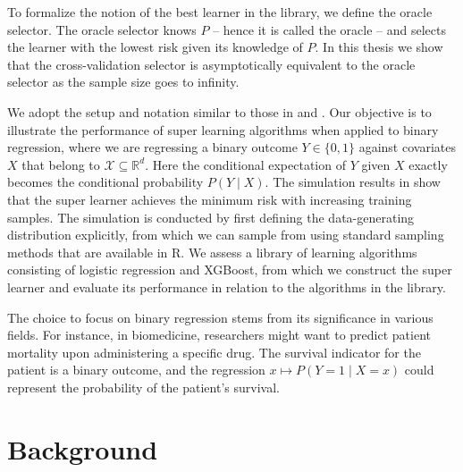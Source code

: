 \documentclass[11pt, a4paper]{article}
\theoremstyle{definition}
\theoremstyle{remark}
\begin{document}
To formalize the notion of the best learner in the library, we define the oracle selector. The oracle selector knows $ P $ -- hence it is called the oracle -- and selects the learner with the lowest risk given its knowledge of $ P $. In this thesis we show that the cross-validation selector is asymptotically equivalent to the oracle selector as the sample size goes to infinity. 

We adopt the setup and notation similar to those in \citet{vaart06} and \citet{laan03}. Our objective is to illustrate the performance of super learning algorithms when applied to binary regression, where we are regressing a binary outcome $ Y \in \{0,1\} $ against covariates $ X $ that belong to $ \mathcal{X} \subseteq \mathbb{R}^{d} $. Here the conditional expectation of $ Y $ given $ X $ exactly becomes the conditional probability $ P(Y \mid X) $. The simulation results in  show that the super learner achieves the minimum risk with increasing training samples. The simulation is conducted by first defining the data-generating distribution explicitly, from which we can sample from using standard sampling methods that are available in R. We assess a library of learning algorithms consisting of logistic regression and XGBoost, from which we construct the super learner and evaluate its performance in relation to the algorithms in the library.

The choice to focus on binary regression stems from its significance in various fields. For instance, in biomedicine, researchers might want to predict patient mortality upon administering a specific drug. The survival indicator for the patient is a binary outcome, and the regression $ x \mapsto P(Y = 1 \mid X = x) $ could represent the probability of the patient's survival. 

\section{Background}
\end{document}

